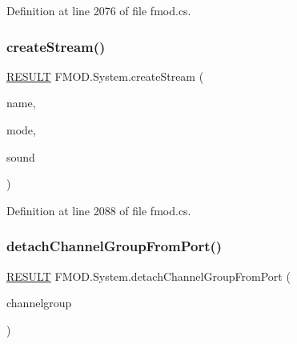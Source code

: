 Definition at line 2076 of file fmod.\+cs.

\mbox{\label{class_f_m_o_d_1_1_system_a73b94422dd9728b7e0352a7695e1fbda}} 
\subsubsection{\texorpdfstring{create\+Stream()}{createStream()}\hspace{0.1cm}{\footnotesize\ttfamily [3/3]}}
{\footnotesize\ttfamily \hyperlink{namespace_f_m_o_d_a305d1176ef3f8c8815861a60407ac33d}{R\+E\+S\+U\+LT} F\+M\+O\+D.\+System.\+create\+Stream (\begin{DoxyParamCaption}\item[{string}]{name,  }\item[{\hyperlink{namespace_f_m_o_d_a94ab158a8314f5f4248f1aea55dbefa3}{M\+O\+DE}}]{mode,  }\item[{out \hyperlink{class_f_m_o_d_1_1_sound}{Sound}}]{sound }\end{DoxyParamCaption})}



Definition at line 2088 of file fmod.\+cs.

\mbox{\label{class_f_m_o_d_1_1_system_af9f0dbec1c2ca7e7c13cd1c058373b39}} 
\subsubsection{\texorpdfstring{detach\+Channel\+Group\+From\+Port()}{detachChannelGroupFromPort()}}
{\footnotesize\ttfamily \hyperlink{namespace_f_m_o_d_a305d1176ef3f8c8815861a60407ac33d}{R\+E\+S\+U\+LT} F\+M\+O\+D.\+System.\+detach\+Channel\+Group\+From\+Port (\begin{DoxyParamCaption}\item[{\hyperlink{class_f_m_o_d_1_1_channel_group}{Channel\+Group}}]{channelgroup }\end{DoxyParamCaption})}



